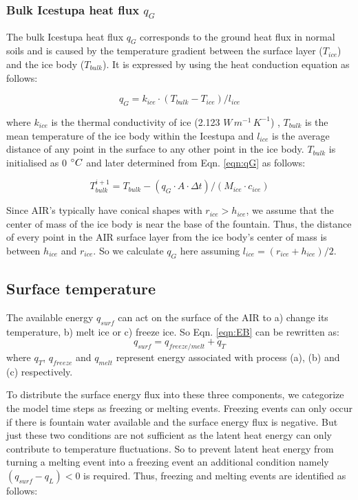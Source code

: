 \documentclass[utf8]{frontiersSCNS} %
\begin{document}
\subsubsection{Bulk Icestupa heat flux \texorpdfstring{$q_{G}$}{Lg}} \label{sec:Bulkflux}
The bulk Icestupa heat flux $q_{G}$ corresponds to the ground heat flux in normal soils and is caused by the temperature
gradient between the surface layer ($T_{ice}$) and the ice body ($T_{bulk}$). It is expressed by using the heat
conduction equation as follows:

\begin{equation} q_{G} = k_{ice} \cdot (T_{bulk}-T_{ice})/l_{ice} \label{eqn:qG}    \end{equation}

where $k_{ice}$ is the thermal conductivity of ice (2.123 $W\, m^{-1}\,K^{-1}$) , $T_{bulk}$ is the mean temperature of
the ice body within the Icestupa and $l_{ice}$ is the average distance of any point in the surface to any other point in
the ice body. $T_{bulk}$ is initialised as 0 $\degree C$ and later determined from Eqn. \ref{eqn:qG} as follows:

\begin{equation} T_{bulk}^{i+1} = T_{bulk} - (q_{G} \cdot A \cdot \Delta t)/(M_{ice} \cdot c_{ice}) \end{equation}

Since AIR's typically have conical shapes with $r_{ice} > h_{ice}$, we assume that the center of mass of the ice body
is near the base of the fountain. Thus, the distance of every point in the AIR surface layer from the ice body's center
of mass is between $h_{ice}$ and $r_{ice}$. So we calculate $q_{G}$ here assuming $l_{ice} = (r_{ice} + h_{ice})/2$.

\subsection{Surface temperature}
The available energy $q_{surf}$ can act on the surface of the AIR to a) change its temperature, b) melt ice or
c) freeze ice. So Eqn. \ref{eqn:EB} can be rewritten as: \begin{equation} q_{surf} = q_{freeze/melt} +
	q_{T} \end{equation}
where $q_{T}$, $q_{freeze}$ and $q_{melt}$ represent energy associated with process (a), (b) and (c) respectively.

To distribute the surface energy flux into these three components, we categorize the model time steps as freezing or
melting events. Freezing events can only occur if there is fountain water available and the surface energy flux is
negative. But just these two conditions are not sufficient as the latent heat energy can only contribute to temperature
fluctuations. So to prevent latent heat energy from turning a melting event into a freezing event an additional
condition namely $(q_{surf}-q_{L}) < 0$ is required. Thus, freezing and melting events are identified as follows:
\end{document}
